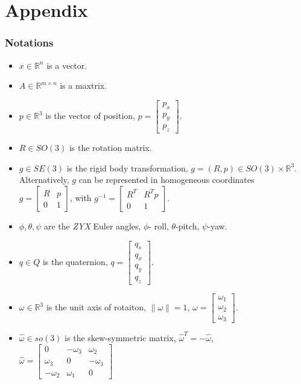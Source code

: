 \chapter*{Appendix}
\subsection{Notations}
\begin{itemize}
\item $x \in \mathbb{R}^n$ is a vector.
\item $A \in \mathbb{R}^{m \times n}$  is a  maxtrix.
\item $p \in \mathbb{R}^3$ is the vector of position,
$ p = \begin{bmatrix}
p_x \\
p_y  \\
p_z
\end{bmatrix}.$
\item $R \in SO(3)$  is the rotation matrix.
\item $g \in SE(3)$ is the rigid body transformation, $g = (R, p) \in SO(3) \times \mathbb{R}^3$. \\
Alternatively, $g$ can be represented in homogeneous coordinates \\
$
g =
\begin{bmatrix}
 R &  p \\
0 & 1
 \end{bmatrix}
$,
with
$
g^{-1} =
\begin{bmatrix}
 R^T & R^T p \\
0 & 1
 \end{bmatrix}
$.


\item $\phi, \theta, \psi$ are the {\it ZYX} Euler angles, $\phi$- roll, $\theta$-pitch, $\psi$-yaw.

\item $q \in Q$  is the quaternion,
$ q = \begin{bmatrix}
q_s \\
q_x \\
q_y  \\
q_z
\end{bmatrix}$.

\item $\omega \in \mathbb{R}^3$ is the unit axis of rotaiton, $\|\omega\| = 1$,
$ \omega = \begin{bmatrix}
\omega_1 \\
\omega_2  \\
\omega_3
\end{bmatrix}.$

\item $\hat \omega \in so(3)$ is the skew-symmetric matrix, $ \hat \omega^T = - \hat \omega$,
$
\hat \omega =
\begin{bmatrix}
 0 & -\omega_3 & \omega_2 \\
\omega_3 & 0 & -\omega_1 \\
 -\omega_2 & \omega_1 & 0
 \end{bmatrix}
$

\end{itemize}

